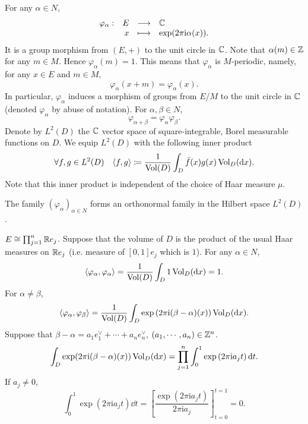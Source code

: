 For any $\alpha \in N$,
$$\begin{array}{rrcl}
    \varphi_\alpha : & E & \longrightarrow & \mathbb{C}\\
    & x & \longmapsto & \exp (2 \pi \mathrm{i} \alpha(x)).
\end{array}$$
It is a group morphism from $(E,+)$ to the unit circle in $\mathbb{C}$.
Note that $\alpha(m) \in \mathbb{Z}$ for any $m \in M$.
Hence $\varphi_{\alpha} (m) = 1$.
This means that $\varphi_{\alpha}$ is $M$-periodic, namely, for any $x \in E$ and $m \in M$,
$$\varphi_{\alpha}(x + m) = \varphi_{\alpha}(x).$$
In particular, $\varphi_{\alpha}$ induces a morphism of groups from $E/M$ to the unit circle in $\mathbb{C}$ (denoted $\varphi_{\alpha}$ by abuse of notation).
For $\alpha, \beta \in N$,
$$\varphi_{\alpha + \beta} = \varphi_{\alpha} \varphi_{\beta}.$$
Denote by $L^2(D)$ the $\mathbb{C}$ vector space of square-integrable, Borel measurable functions on $D$.
We equip $L^2(D)$ with the following inner product
$$\forall f,g \in L^2(D) \quad \langle f,g \rangle \coloneq \frac{1}{\mathrm{Vol}(D)}\int_{D} \bar{f}(x) g(x) \operatorname{\mathrm{Vol}}_D(\mathrm{d} x).$$
Note that this inner product is independent of the choice of Haar measure $\mu$.

\begin{propositionenv}
    The family $(\varphi_{\alpha})_{\alpha \in N}$ forms an orthonormal family in the Hilbert space $L^2(D)$.
\end{propositionenv}
\begin{proofenv}
    $E \cong \prod_{j=1}^{n} \mathbb{R} e_j$.
    Suppose that the volume of $D$ is the product of the usual Haar measures on $\mathbb{R} e_{j}$ (i.e. measure of $[0,1]e_j$ which is $1$).
    For any $\alpha \in N$,
    $$\langle \varphi_\alpha, \varphi_\alpha \rangle = \frac{1}{\operatorname{\mathrm{Vol}}(D)} \int_D 1 \operatorname{\mathrm{Vol}}_D(\mathrm{d} x) = 1.$$
    For $\alpha \neq \beta$,
    $$\langle \varphi_\alpha, \varphi_\beta \rangle = \frac{1}{\operatorname{\mathrm{Vol}}(D)} \int_D \exp\left(2 \pi \mathrm{i} (\beta - \alpha)(x)\right) \operatorname{\mathrm{Vol}}_{D}(\mathrm{d} x).$$
    Suppose that $\beta - \alpha = a_1 e^\vee_1 + \cdots + a_n e^\vee_n$, $(a_1,\cdots,a_n) \in \mathbb{Z}^n$.
    $$\int_{D} \exp(2 \pi \mathrm{i} (\beta - \alpha)(x))\operatorname{\mathrm{Vol}}_D(\mathrm{d} x) = \prod_{j=1}^{n} \int_{0}^{1} \exp\left(2 \pi \mathrm{i}a_{j} t\right) \mathrm{d} t.$$
    If $a_j \neq 0$,
    $$\int_{0}^{1} \exp(2 \pi \mathrm{i} a_j t) \dd t = \left[\frac{\exp(2 \pi \mathrm{i} a_j t)}{2 \pi \mathrm{i} a_j}\right]_{t = 0}^{t = 1} = 0.$$
\end{proofenv}

